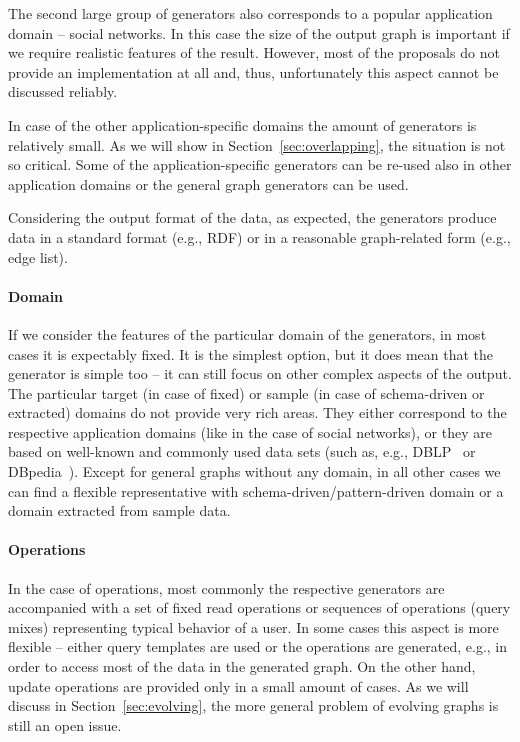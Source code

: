 The second large group of generators also corresponds to a popular application domain -- social networks. In this case the size of the output graph is important if we require realistic features of the result. However, most of the proposals do not provide an implementation at all and, thus, unfortunately this aspect cannot be discussed reliably.

In case of the other application-specific domains the amount of generators is relatively small. As we will show in Section~\ref{sec:overlapping}, the situation is not so critical. Some of the application-specific generators can be re-used also in other application domains or the general graph generators can be used.

Considering the output format of the data, as expected, the generators produce data in a standard format (e.g., RDF) or in a reasonable graph-related form (e.g., edge list).

\paragraph{Domain}

If we consider the features of the particular domain of the generators, in most cases it is expectably fixed. It is the simplest option, but it does mean that the generator is simple too -- it can still focus on other complex aspects of the output. The particular target (in case of fixed) or sample (in case of schema-driven or extracted) domains do not provide very rich areas. They either correspond to the respective application domains (like in the case of social networks), or they are based on well-known and commonly used data sets (such as, e.g., DBLP~\cite{dblp} or DBpedia~\cite{Bizer:2009:DCP:1640541.1640848}). Except for general graphs without any domain, in all other cases we can find a flexible representative with schema-driven/pattern-driven domain or a domain extracted from sample data.


\paragraph{Operations}
In the case of operations, most commonly the respective generators are accompanied with a set of fixed read operations or sequences of operations (query mixes) representing typical behavior of a user. In some cases this aspect is more flexible -- either query templates are used or the operations are generated, e.g., in order to access most of the data in the generated graph. On the other hand, update operations are provided only in a small amount of cases. As we will discuss in Section~\ref{sec:evolving}, the more general problem of evolving graphs is still an open issue.

